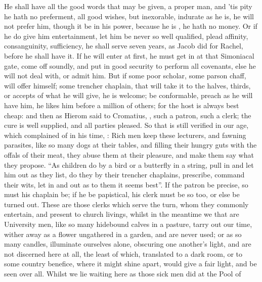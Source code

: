 He shall have all the good words that may be given, a
proper man, and 'tis pity he hath no preferment, all good wishes, but
inexorable, indurate as he is, he will not prefer him, though it be in his
power, because he is , he hath no money. Or if he do give him
entertainment, let him be never so well qualified, plead affinity,
consanguinity, sufficiency, he shall serve seven years, as Jacob did for
Rachel, before he shall have it. If he will enter at
first, he must get in at that Simoniacal gate, come off soundly, and put in
good security to perform all covenants, else he will not deal with, or admit
him. But if some poor scholar, some parson chaff, will offer himself; some
trencher chaplain, that will take it to the halves, thirds, or accepts of what
he will give, he is welcome; be conformable, preach as he will have him, he
likes him before a million of others; for the host is always best cheap: and
then as Hierom said to Cromatius, , such a patron,
such a clerk; the cure is well supplied, and all parties pleased. So that is
still verified in our age, which \Chrysostom{} complained of
in his time, : Rich
men keep these lecturers, and fawning parasites, like so many dogs at their
tables, and filling their hungry guts with the offals of their meat, they abuse
them at their pleasure, and make them say what they propose.
\enquote{As children do by a bird or a butterfly in a string, pull
in and let him out as they list, do they by their trencher chaplains,
prescribe, command their wits, let in and out as to them it seems best}. If the
patron be precise, so must his chaplain be; if he be papistical, his clerk must
be so too, or else be turned out. These are those clerks which serve the turn,
whom they commonly entertain, and present to church livings, whilst in the
meantime we that are University men, like so many hidebound calves in a
pasture, tarry out our time, wither away as a flower ungathered in a garden,
and are never used; or as so many candles, illuminate ourselves alone,
obscuring one another's light, and are not discerned here at all, the least of
which, translated to a dark room, or to some country benefice, where it might
shine apart, would give a fair light, and be seen over all. Whilst we lie
waiting here as those sick men did at the Pool of
